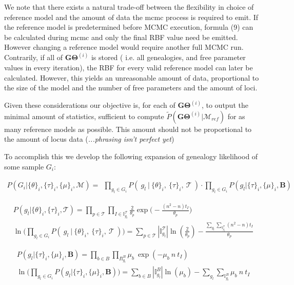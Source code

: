 \documentclass[11pt]{article}
\newcommand{\vect}[1]{\boldsymbol{\mathbf{#1}}}
\newcommand{\M}{\mathcal{M}}
\newcommand{\Tr}{\mathcal{T}}
\newcommand{\B}{\vect{B}}
\newcommand{\G}{\vect{G}}
\newcommand{\T}{\vect{\Theta}}
\newcommand{\It}{\mathbb{I}_{g_l}^{\Tr}}
\newcommand{\Ib}{\mathbb{I}_{g_l}^B}
\newcommand{\GT}{\G\T}
\newcommand{\Mref}{\M_{ref}}
\newcommand{\Pref}{\widetilde{P}}
\begin{document}
\begin{itemize}
We note that there exists a natural trade-off between the flexibility in choice of reference model and the amount of data the mcmc process is required to emit. If the reference model is predetermined before MCMC execution, formula (9) can be calculated during mcmc and only the final RBF value need be emitted. However changing a reference model would require another full MCMC run.
Contrarily, if all of $\GT^{(i)}$ is stored ( i.e. all genealogies, and free parameter values in every iteration), the RBF for every valid reference model can later be calculated. However, this yields an unreasonable amount of data, proportional to the size of the model and the number of free parameters and the amount of loci.

Given these considerations our objective is, for each of $\GT^{(i)}$, to output the minimal amount of statistics, sufficient to compute $\Pref(\GT^{(i)}|\Mref)$ for as many reference models as possible. This amount should not be proportional to the amount of locus data (\textit{...phrasing isn't perfect yet})

To accomplish this we develop the following expansion of genealogy likelihood of some sample $G_i$:

\begin{align}
P(G_i|\{\theta\}_i, \{\tau\}_i, \{\mu\}_i, \M) =~~  
\prod_{g_l \in G_i} P(~g_l~|~\{\theta\}_i,~\{\tau\}_i,~\Tr~) \cdot \prod_{g_l \in G_i} P(g_l | \{\tau\}_i, \{\mu\}_i, \B )
\label{eq:is_harmonic}
\end{align}


\begin{align}
P(g_l | \{\theta\}_i, \{\tau\}_i, \Tr ) = 
\prod_{p\in\Tr} \prod_{I \in \mathbb{I}_{g_l}^{\Tr}} \frac{2}{\theta_p} \exp{\bigg(-\frac{(n^2-n)t_I}{\theta_p}\bigg)} 
\\
\ln{\bigg(\prod_{g_l \in G_i} P(~g_l~|~\{\theta\}_i,~\{\tau\}_i,~\Tr~)\bigg)} = 
\sum_{p\in\Tr}|\It|\ln{(\frac{2}{\theta_p})} - \frac{\sum_{g_l}\sum_{\It}(n^2-n)t_I}{\theta_p}
\label{eq:is_harmonic}
\end{align}



\begin{align}
P(g_l | \{\tau\}_i, \{\mu\}_i, \B ) = 
\prod_{b\in B} \prod_{I  \Ib} \mu_b ~ \exp{( - \mu_b~ n~t_I )}
\\
\ln{\bigg(\prod_{g_l \in G_i} P(g_l | \{\tau\}_i, \{\mu\}_i, \B )\bigg)}=
\sum_{b\in B}|\Ib|\ln{(\mu_b)} - \sum_{g_l}\sum_{\Ib}\mu_b~ n~t_I
\label{eq:is_harmonic}
\end{align}





\end{itemize}
\end{document}
